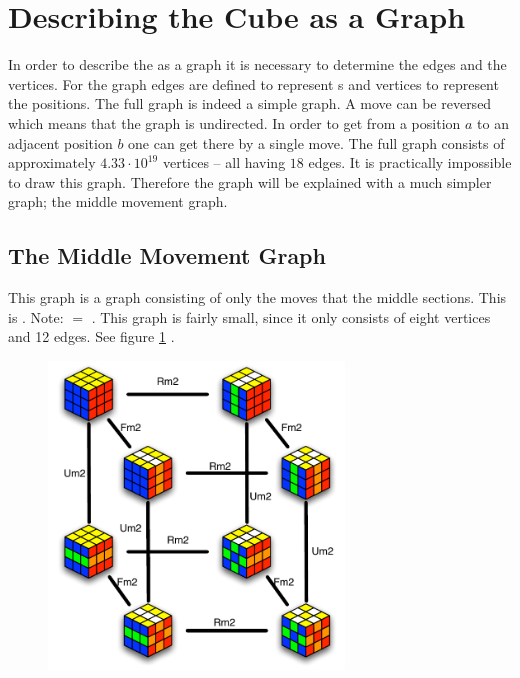 

\section{Describing the Cube as a Graph}
In order to describe the \rubik{} as a graph it is necessary to determine the edges and the vertices. For the \rubik{} graph edges are defined to represent \twist{}s and vertices to represent the positions. 
The full \rubik{} graph is indeed a simple graph. A move can be reversed which means that the graph is undirected. In order to get from a position $a$ to an adjacent position $b$ one can get there by a single move. 
The full \rubik{} graph consists of approximately $4.33\cdot10^{19}$ vertices -- all having $18$ edges.
It is practically impossible to draw this graph. Therefore the graph will be explained with a much simpler graph; the middle movement graph.


\subsection{The Middle Movement Graph}
\label{sub:middleMoveGraph}
This graph is a \rubik{} graph consisting of only the moves that \twist{} the middle sections. 
This is . Note:  $=$ .  This graph is fairly small, since it only consists of eight vertices and 12 edges. See figure \ref{fig:graphMiddleSlice2} \cite[pp. 158-167]{Rubik87}.

\begin{figure}[bht!]
	\centering
		\includegraphics[width = 0.7\textwidth]{input/pics/graphMiddleSlice2.pdf}
	\caption{}
	\label{fig:graphMiddleSlice2}
\end{figure}

